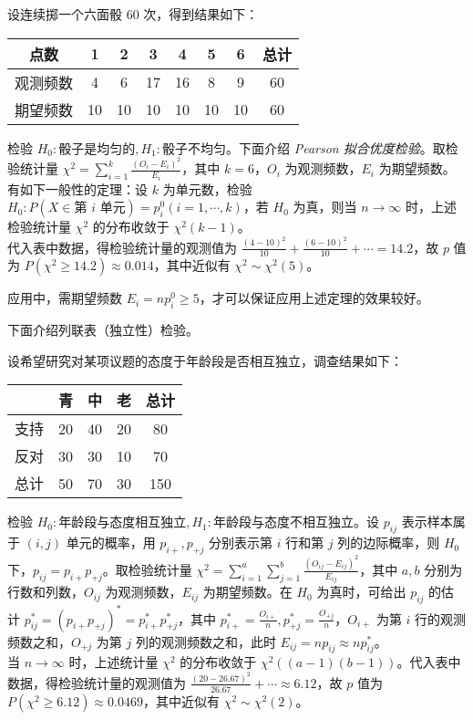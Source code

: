 \documentclass[../main.tex]{subfiles}
\begin{document}
\begin{example}
    设连续掷一个六面骰 $60$ 次，得到结果如下：

    \bigskip
    \begin{tabular}{|c|c|c|c|c|c|c|c|}
        \hline
        点数     & 1  & 2  & 3  & 4  & 5  & 6  & 总计 \\
        \hline
        观测频数 & 4  & 6  & 17 & 16 & 8  & 9  & 60   \\
        \hline
        期望频数 & 10 & 10 & 10 & 10 & 10 & 10 & 60   \\
        \hline
    \end{tabular}
    \bigskip

    \noindent 检验 $H_0:\text{骰子是均匀的},H_1:\text{骰子不均匀}$。下面介绍 \emph{Pearson 拟合优度检验}。取检验统计量 $\chi^2=\sum_{i=1}^k\frac{(O_i-E_i)^2}{E_i}$，其中 $k=6$，$O_i$ 为观测频数，$E_i$ 为期望频数。\\
    有如下一般性的定理：设 $k$ 为单元数，检验 $H_0:P(X\in\text{第 $i$ 单元})=p_i^0(i=1,\cdots,k)$，若 $H_0$ 为真，则当 $n\rightarrow\infty$ 时，上述检验统计量 $\chi^2$ 的分布收敛于 $\chi^2(k-1)$。\\
    代入表中数据，得检验统计量的观测值为 $\frac{(4-10)^2}{10}+\frac{(6-10)^2}{10}+\cdots=14.2$，故 $p$ 值为 $P(\chi^2\geq14.2)\approx0.014$，其中近似有 $\chi^2\sim\chi^2(5)$。
\end{example}

应用中，需期望频数 $E_i=np_i^0\geq 5$，才可以保证应用上述定理的效果较好。

下面介绍列联表（独立性）检验。

\begin{example}
    设希望研究对某项议题的态度于年龄段是否相互独立，调查结果如下：

    \bigskip
    \begin{tabular}{|c|c|c|c|c|}
        \hline
             & 青 & 中 & 老 & 总计 \\
        \hline
        支持 & 20 & 40 & 20 & 80   \\
        \hline
        反对 & 30 & 30 & 10 & 70   \\
        \hline
        总计 & 50 & 70 & 30 & 150  \\
        \hline
    \end{tabular}
    \bigskip

    \noindent 检验 $H_0:\text{年龄段与态度相互独立},H_1:\text{年龄段与态度不相互独立}$。设 $p_{ij}$ 表示样本属于 $(i,j)$ 单元的概率，用 $p_{i+},p_{+j}$ 分别表示第 $i$ 行和第 $j$ 列的边际概率，则 $H_0$ 下，$p_{ij}=p_{i+}p_{+j}$。取检验统计量 $\chi^2=\sum_{i=1}^a\sum_{j=1}^b\frac{(O_{ij}-E_{ij})^2}{E_{ij}}$，其中 $a,b$ 分别为行数和列数，$O_{ij}$ 为观测频数，$E_{ij}$ 为期望频数。在 $H_0$ 为真时，可给出 $p_{ij}$ 的估计 $p_{ij}^*=(p_{i+}p_{+j})^*=p_{i+}^*p_{+j}^*$，其中 $p_{i+}^*=\frac{O_{i+}}n,p_{+j}^*=\frac{O_{+j}}n$，$O_{i+}$ 为第 $i$ 行的观测频数之和，$O_{+j}$ 为第 $j$ 列的观测频数之和，此时 $E_{ij}=np_{ij}\approx np_{ij}^*$。\\
    当 $n\rightarrow\infty$ 时，上述统计量 $\chi^2$ 的分布收敛于 $\chi^2((a-1)(b-1))$。代入表中数据，得检验统计量的观测值为 $\frac{(20-26.67)^2}{26.67}+\cdots\approx6.12$，故 $p$ 值为 $P(\chi^2\geq6.12)\approx0.0469$，其中近似有 $\chi^2\sim\chi^2(2)$。
\end{example}
\end{document}
